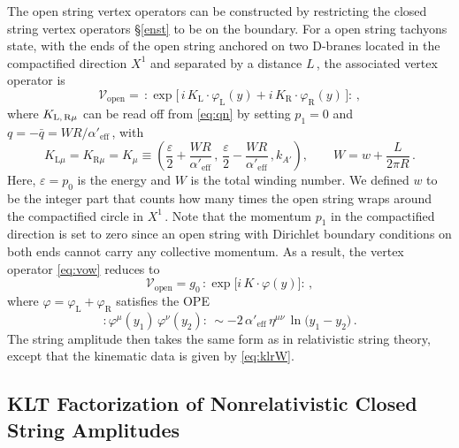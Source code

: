 \documentclass[11pt]{article}
\newcommand{\be}{\begin{equation}}
\newcommand{\ee}{\end{equation}}
\newcommand{\CV}{\mathcal{V}}
\newcommand{\lr}{\left (}
\newcommand{\rr}{\right )}
\begin{document}
The open string vertex operators can be constructed by restricting the closed string vertex operators \S\ref{enst} to be on the boundary. For a open string tachyons state, with the ends of the open string anchored on two D-branes located in the compactified direction $X^1$ and separated by a distance $L$\,, the associated vertex operator is
%
\be \label{eq:vow}
    \CV_\text{open} = \, :\!\exp \bigl[ \, i \, K_\text{L} \cdot \varphi^{}_\text{L} (y) + i \, K_\text{R} \cdot \varphi^{}_\text{R} (y) \, \bigr] \!:\,,
\ee
%
where $K_{\text{L,\,R}\mu}$ can be read off from \eqref{eq:qn} by setting $p^{}
_1 = 0$ and $q = - \bar{q} = W R / \alpha'_\text{eff}$\,, with
%
\be \label{eq:klrW}
    K_{\text{L}\mu} = K_{\text{R}\mu} = K_\mu \equiv \lr \frac{\varepsilon}{2} + \frac{W R}{\alpha'_\text{eff}}\,,\, \frac{\varepsilon}{2} - \frac{W R}{\alpha'_\text{eff}}\,, k_{A'} \rr,
        \qquad%
    W = w + \frac{L}{2\pi R}\,.
\ee
%
Here, $\varepsilon = p^{}_0$ is the energy and $W$ is the total winding number. We defined $w$ to be the integer part that counts how many times the open string wraps around the compactified circle in $X^1$\,. Note that the momentum $p^{}_1$ in the compactified direction is set to zero since an open string with Dirichlet boundary conditions on both ends cannot carry any collective momentum. As a result, the vertex operator \eqref{eq:vow} reduces to
%
\be \label{eq:vowsim}
    \CV_\text{open} = g_{\text{0}}\, :\! \exp \! \big[ i \, K \cdot \varphi (y) \bigr] \!:\,,
\ee
%
where $\varphi = \varphi^{}_\text{L} + \varphi^{}_\text{R}$ satisfies the OPE
%
\be \label{eq:opeff}
    :\! \varphi^\mu (y_1) \, \varphi^\nu (y_2) \!: \, \sim - 2 \, \alpha'_\text{eff} \, \eta^{\mu\nu} \, \ln \bigl( y_1 - y_2
    \bigr)\,.  
\ee
%
The string amplitude then takes the same form as in relativistic string theory, except that the kinematic data is given by \eqref{eq:klrW}.

\subsection{KLT Factorization of Nonrelativistic Closed String Amplitudes} \label{sec:kltfncsa}
\end{document}
